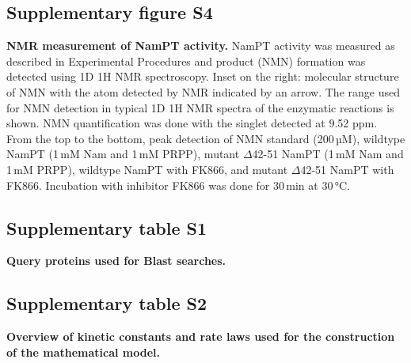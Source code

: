 \subsection*{Supplementary figure S4}

\textbf{NMR measurement of NamPT activity.} NamPT activity was measured as described in Experimental Procedures and product (NMN) formation was detected using 1D 1H NMR spectroscopy. Inset on the right: molecular structure of NMN with the atom detected by NMR indicated by an arrow. The range used for NMN detection in typical 1D 1H NMR spectra of the enzymatic reactions is shown. NMN quantification was done with the singlet detected at 9.52 ppm. From the top to the bottom, peak detection of NMN standard (200\,µM), wildtype NamPT (1\,mM Nam and 1\,mM PRPP), mutant $\Delta$42-51 NamPT (1\,mM Nam and 1\,mM PRPP), wildtype NamPT with FK866, and mutant $\Delta$42-51 NamPT with FK866. Incubation with inhibitor FK866 was done for 30\,min at 30\,°C.


\subsection*{Supplementary table S1}

\textbf{Query proteins used for Blast searches.}


\subsection*{Supplementary table S2}

\textbf{Overview of kinetic constants and rate laws used for the construction of the mathematical model.}
